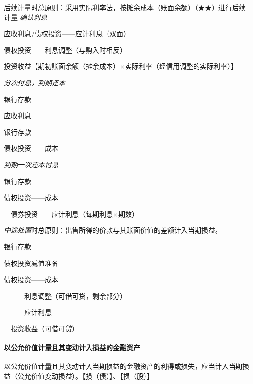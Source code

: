 \documentclass[UTF8,12pt]{ctexart}
\newenvironment{Dr}{%
	\begin{list}{}%
		{
			\setlength{\leftmargin}{2em}
			\setlength{\labelwidth}{2em}
			\setlength{\labelsep}{0pt}
			\setlength{\itemindent}{0pt}
			\setlength{\listparindent}{0pt}
			\setlength{\parsep}{0pt}
			\setlength{\topsep}{0pt}
		}
		\item[\textbf{借：}]
	}{%
	\end{list}
}
\newenvironment{Cr}{%
	\begin{list}{}%
		{
			\setlength{\leftmargin}{2em}
			\setlength{\labelwidth}{2em}
			\setlength{\labelsep}{0pt}
			\setlength{\itemindent}{0pt}
			\setlength{\listparindent}{0pt}
			\setlength{\parsep}{0pt}
			\setlength{\topsep}{0pt}
		}
		\item[\textbf{贷：}]
	}{%
	\end{list}
}
\numberwithin{equation}{section} %
\numberwithin{figure}{section}
\numberwithin{table}{section}
\begin{document}
	后续计量时总原则：采用实际利率法，按摊余成本（账面余额）（★★）进行后续计量
	\textit{确认利息}
	
	\begin{Dr}
		应收利息/债权投资——应计利息（双面）
		
		债权投资——利息调整（与购入时相反）
	\end{Dr}
	\begin{Cr}
		投资收益【期初账面余额（摊余成本）×实际利率（经信用调整的实际利率）】
	\end{Cr}

	\textit{分次付息，到期还本}
	
	\begin{Dr}
		银行存款
	\end{Dr}
	\begin{Cr}
		应收利息
	\end{Cr}
	\begin{Dr}
		银行存款
	\end{Dr}
	\begin{Cr}
		债权投资——成本
	\end{Cr}

	\textit{到期一次还本付息}
	
	\begin{Dr}
		银行存款
	\end{Dr}
	\begin{Cr}
		债权投资——成本
		
		\ \ 债券投资——应计利息（每期利息×期数）
	\end{Cr}
	
	\textit{中途处置}时总原则：出售所得的价款与其账面价值的差额计入当期损益。
	
	\begin{Dr}
		银行存款
		
		债权投资减值准备
	\end{Dr}
	\begin{Cr}
		债权投资——成本
		
		\ \ ——利息调整（可借可贷，剩余部分）
		
		\ \ ——应计利息
		
		\ \ 投资收益（可借可贷）
	\end{Cr}

	
	
	
	\paragraph{以公允价值计量且其变动计入损益的金融资产}
	以公允价值计量且其变动计入当期损益的金融资产的利得或损失，应当计入当期损益（公允价值变动损益）。【损（债）】、【损（股）】
	
\end{document}
